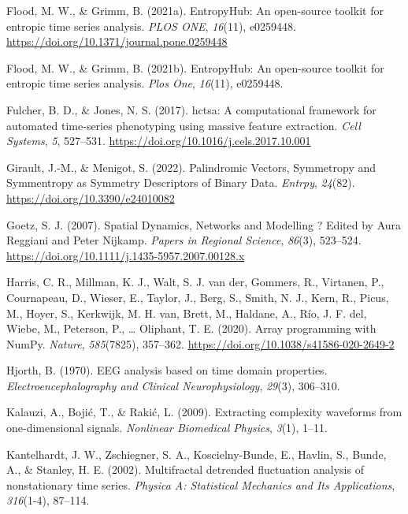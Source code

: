 \documentclass[
  man]{apa6}
\newlength{\cslhangindent}
\newlength{\cslentryspacingunit} %
\newenvironment{CSLReferences}[2] %
 {%
  \setlength{\parindent}{0pt}
  \ifodd #1
  \let\oldpar\par
  \def\par{\hangindent=\cslhangindent\oldpar}
  \fi
  \setlength{\parskip}{#2\cslentryspacingunit}
 }%
 {}
\begin{document}
\begin{CSLReferences}{1}{0}
\leavevmode{}%
Flood, M. W., \& Grimm, B. (2021a). EntropyHub: An open-source toolkit for entropic time series analysis. \emph{PLOS ONE}, \emph{16}(11), e0259448. \url{https://doi.org/10.1371/journal.pone.0259448}

\leavevmode{}%
Flood, M. W., \& Grimm, B. (2021b). EntropyHub: An open-source toolkit for entropic time series analysis. \emph{Plos One}, \emph{16}(11), e0259448.

\leavevmode{}%
Fulcher, B. D., \& Jones, N. S. (2017). hctsa: A computational framework for automated time-series phenotyping using massive feature extraction. \emph{Cell Systems}, \emph{5}, 527--531. \url{https://doi.org/10.1016/j.cels.2017.10.001}

\leavevmode{}%
Girault, J.-M., \& Menigot, S. (2022). Palindromic Vectors, Symmetropy and Symmentropy as Symmetry Descriptors of Binary Data. \emph{Entrpy}, \emph{24}(82). \url{https://doi.org/10.3390/e24010082}

\leavevmode{}%
Goetz, S. J. (2007). Spatial Dynamics, Networks and Modelling ? Edited by Aura Reggiani and Peter Nijkamp. \emph{Papers in Regional Science}, \emph{86}(3), 523--524. \url{https://doi.org/10.1111/j.1435-5957.2007.00128.x}

\leavevmode{}%
Harris, C. R., Millman, K. J., Walt, S. J. van der, Gommers, R., Virtanen, P., Cournapeau, D., Wieser, E., Taylor, J., Berg, S., Smith, N. J., Kern, R., Picus, M., Hoyer, S., Kerkwijk, M. H. van, Brett, M., Haldane, A., Río, J. F. del, Wiebe, M., Peterson, P., \ldots{} Oliphant, T. E. (2020). Array programming with {NumPy}. \emph{Nature}, \emph{585}(7825), 357--362. \url{https://doi.org/10.1038/s41586-020-2649-2}

\leavevmode{}%
Hjorth, B. (1970). EEG analysis based on time domain properties. \emph{Electroencephalography and Clinical Neurophysiology}, \emph{29}(3), 306--310.

\leavevmode{}%
Kalauzi, A., Bojić, T., \& Rakić, L. (2009). Extracting complexity waveforms from one-dimensional signals. \emph{Nonlinear Biomedical Physics}, \emph{3}(1), 1--11.

\leavevmode{}%
Kantelhardt, J. W., Zschiegner, S. A., Koscielny-Bunde, E., Havlin, S., Bunde, A., \& Stanley, H. E. (2002). Multifractal detrended fluctuation analysis of nonstationary time series. \emph{Physica A: Statistical Mechanics and Its Applications}, \emph{316}(1-4), 87--114.


\end{CSLReferences}
\end{document}
